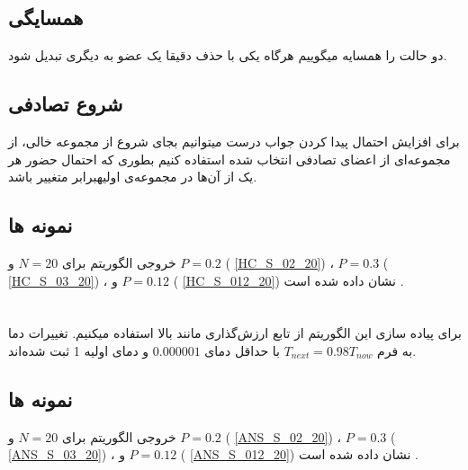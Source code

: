 \subsection{همسایگی}
دو حالت را همسایه میگوییم هرگاه یکی با حذف دقیقا یک عضو به دیگری تبدیل شود.

\subsection{شروع تصادفی}
برای افزایش احتمال پیدا کردن جواب درست میتوانیم بجای شروع از مجموعه خالی، از مجموعه‌ای از اعضای تصادفی انتخاب شده استفاده کنیم بطوری که احتمال حضور هر یک از آن‌ها در مجموعه‌ی اولیهبرابر متغییر
\rmfamily
باشد.

\subsection{نمونه ها}

خروجی الگوریتم برای
$N=20$
و 
$P=0.2$
(
\cref{HC_S_02_20})
،
$P=0.3$
(
\cref{HC_S_03_20})
،
و
$P=0.12$
(
\cref{HC_S_012_20})
نشان داده شده است
.



\section{}
برای پیاده سازی این الگوریتم
 از تابع ارزش‌گذاری مانند بالا استفاده میکنیم. تغییرات دما به فرم 
$T_{next}=0.98 T_{now}$
با حداقل دمای  $0.000001$ و دمای اولیه 1 ثبت شده‌اند.

\subsection{نمونه ها}

خروجی الگوریتم برای
$N=20$
و 
$P=0.2$
(
\cref{ANS_S_02_20})
،
$P=0.3$
(
\cref{ANS_S_03_20})
،
و
$P=0.12$
(
\cref{ANS_S_012_20})
نشان داده شده است
.

